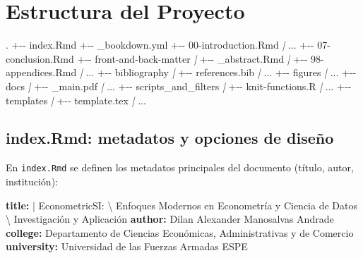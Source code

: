 \documentclass[a4paper, nobind]{templates/ociamthesis}
\newenvironment{Shaded}{\begin{snugshade}}{\end{snugshade}}
\newcommand{\AttributeTok}[1]{\textcolor[rgb]{0.13,0.29,0.53}{#1}}
\newcommand{\CharTok}[1]{\textcolor[rgb]{0.31,0.60,0.02}{#1}}
\newcommand{\FunctionTok}[1]{\textcolor[rgb]{0.13,0.29,0.53}{\textbf{#1}}}
\newcommand{\KeywordTok}[1]{\textcolor[rgb]{0.13,0.29,0.53}{\textbf{#1}}}
\newcommand{\NormalTok}[1]{#1}
\newcommand{\PreprocessorTok}[1]{\textcolor[rgb]{0.56,0.35,0.01}{\textit{#1}}}
\renewenvironment{Shaded}
{
  \vspace{10pt}%
  \begin{snugshade}%
}{%
  \end{snugshade}%
  \vspace{8pt}%
}
\begin{document}
\section{Estructura del Proyecto}\label{estructura-del-proyecto}

\begin{Shaded}
\begin{Highlighting}[]
\NormalTok{.}
\NormalTok{+{-}{-} index.Rmd}
\NormalTok{+{-}{-} \_bookdown.yml}
\NormalTok{+{-}{-} 00{-}introduction.Rmd}
\PreprocessorTok{|}\NormalTok{   ...}
\NormalTok{+{-}{-} 07{-}conclusion.Rmd}
\NormalTok{+{-}{-} front{-}and{-}back{-}matter}
\PreprocessorTok{|}\NormalTok{   +{-}{-} \_abstract.Rmd}
\PreprocessorTok{|}\NormalTok{   +{-}{-} 98{-}appendices.Rmd}
\PreprocessorTok{|}\NormalTok{   ...}
\NormalTok{+{-}{-} bibliography}
\PreprocessorTok{|}\NormalTok{   +{-}{-} references.bib}
\PreprocessorTok{|}\NormalTok{   ...}
\NormalTok{+{-}{-} figures}
\PreprocessorTok{|}\NormalTok{   ...}
\NormalTok{+{-}{-} docs}
\PreprocessorTok{|}\NormalTok{   +{-}{-} \_main.pdf}
\PreprocessorTok{|}\NormalTok{   ...}
\NormalTok{+{-}{-} scripts\_and\_filters}
\PreprocessorTok{|}\NormalTok{   +{-}{-} knit{-}functions.R}
\PreprocessorTok{|}\NormalTok{   ...}
\NormalTok{+{-}{-} templates}
\PreprocessorTok{|}\NormalTok{   +{-}{-} template.tex}
\PreprocessorTok{|}\NormalTok{   ...}
\end{Highlighting}
\end{Shaded}

\subsection{\texorpdfstring{index.Rmd: \textbf{metadatos y opciones de diseño}}{index.Rmd: metadatos y opciones de diseño}}\label{index.rmd-metadatos-y-opciones-de-diseuxf1o}

En \texttt{index.Rmd} se definen los metadatos principales del documento (título, autor, institución):

\begin{Shaded}
\begin{Highlighting}[]
\FunctionTok{title}\KeywordTok{: }\CharTok{|}
\NormalTok{  EconometricSI: \textbackslash{}}
\NormalTok{  Enfoques Modernos en Econometría y Ciencia de Datos \textbackslash{}}
\NormalTok{  Investigación y Aplicación}
\FunctionTok{author}\KeywordTok{:}\AttributeTok{ Dilan Alexander Manosalvas Andrade}
\FunctionTok{college}\KeywordTok{:}\AttributeTok{ Departamento de Ciencias Económicas, Administrativas y de Comercio}
\FunctionTok{university}\KeywordTok{:}\AttributeTok{ Universidad de las Fuerzas Armadas ESPE}
\end{Highlighting}
\end{Shaded}
\end{document}
